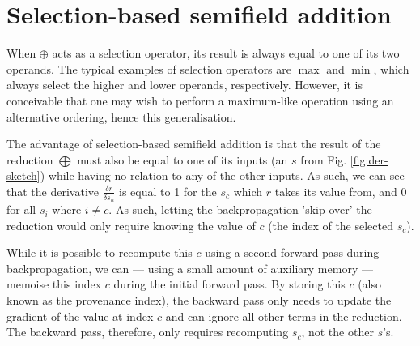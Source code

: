 \documentclass[a4paper, 12pt, openright]{report}
\begin{document}
\section{Selection-based semifield addition}
\label{sec:select-derive}
When $\oplus$ acts as a selection operator, its result is always equal to one of its two operands. The typical examples of selection operators are $\max$ and $\min$, which always select the higher and lower operands, respectively. However, it is conceivable that one may wish to perform a maximum-like operation using an alternative ordering, hence this generalisation.

The advantage of selection-based semifield addition is that the result of the reduction $\bigoplus$ must also be equal to one of its inputs (an $s$ from Fig. \ref{fig:der-sketch}) while having no relation to any of the other inputs. As such, we can see that the derivative $\frac{\delta r}{\delta s_n}$ is equal to 1 for the $s_c$ which $r$ takes its value from, and 0 for all $s_i$ where $i\ne c$. As such, letting the backpropagation 'skip over' the reduction would only require knowing the value of $c$ (the index of the selected $s_c$).

While it is possible to recompute this $c$ using a second forward pass during backpropagation, we can --- using a small amount of auxiliary memory --- memoise this index $c$ during the initial forward pass. By storing this $c$ (also known as the provenance index), the backward pass only needs to update the gradient of the value at index $c$ and can ignore all other terms in the reduction. The backward pass, therefore, only requires recomputing $s_c$, not the other $s$'s.
\end{document}

